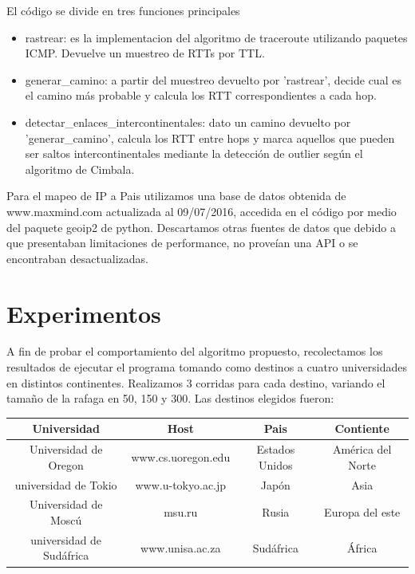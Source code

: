 El código se divide en tres funciones principales
\begin{itemize}
	\item{rastrear: es la implementacion del algoritmo de traceroute utilizando paquetes ICMP. Devuelve un muestreo de RTTs por TTL.}
	\item{generar\_camino: a partir del muestreo devuelto por 'rastrear', decide cual es el camino más probable y calcula los RTT correspondientes a cada hop.}
	\item{detectar\_enlaces\_intercontinentales: dato un camino devuelto por 'generar\_camino', calcula los RTT entre hops y marca aquellos que pueden ser saltos intercontinentales mediante la detección de outlier según el algoritmo de Cimbala.}
\end{itemize}	

Para el mapeo de IP a Pais utilizamos una base de datos obtenida de www.maxmind.com actualizada al 09/07/2016, accedida en el código por medio del paquete geoip2 de python. Descartamos otras fuentes de datos que debido a que presentaban limitaciones de performance, no proveían una API o se encontraban desactualizadas. 


\section{Experimentos}
A fin de probar el comportamiento del algoritmo propuesto, recolectamos los resultados de ejecutar el programa tomando como destinos a cuatro universidades en distintos continentes. Realizamos 3 corridas para cada destino, variando el tamaño de la rafaga en 50, 150 y 300.
Las destinos elegidos fueron:

\begin{center}
   \begin{tabular}{ | c | c | c | c | }
     \hline
     \textbf{Universidad} & \textbf{Host} & \textbf{Pais} & \textbf{Contiente} \\ \hline
     Universidad de Oregon & www.cs.uoregon.edu & Estados Unidos & América del Norte\\ \hline
     universidad de Tokio & www.u-tokyo.ac.jp& Japón & Asia\\ \hline
     Universidad de Moscú & msu.ru & Rusia & Europa del este\\ \hline
     universidad de Sudáfrica & www.unisa.ac.za & Sudáfrica & África \\ \hline
   \end{tabular}
 \end{center}
 
